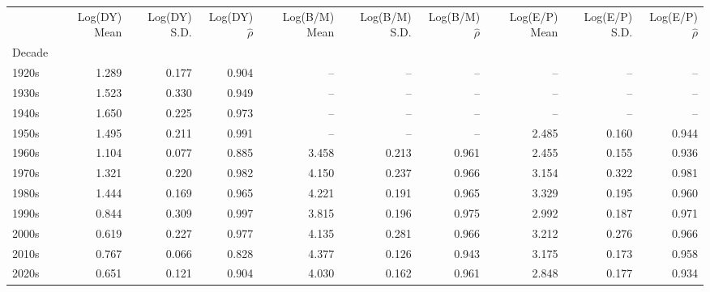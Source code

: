 \begin{tabular}{lrrrrrrrrr}
\toprule
 & Log(DY) Mean & Log(DY) S.D. & Log(DY) $\hat\rho$ & Log(B/M) Mean & Log(B/M) S.D. & Log(B/M) $\hat\rho$ & Log(E/P) Mean & Log(E/P) S.D. & Log(E/P) $\hat\rho$ \\
Decade &  &  &  &  &  &  &  &  &  \\
\midrule
1920s & 1.289 & 0.177 & 0.904 & -- & -- & -- & -- & -- & -- \\
1930s & 1.523 & 0.330 & 0.949 & -- & -- & -- & -- & -- & -- \\
1940s & 1.650 & 0.225 & 0.973 & -- & -- & -- & -- & -- & -- \\
1950s & 1.495 & 0.211 & 0.991 & -- & -- & -- & 2.485 & 0.160 & 0.944 \\
1960s & 1.104 & 0.077 & 0.885 & 3.458 & 0.213 & 0.961 & 2.455 & 0.155 & 0.936 \\
1970s & 1.321 & 0.220 & 0.982 & 4.150 & 0.237 & 0.966 & 3.154 & 0.322 & 0.981 \\
1980s & 1.444 & 0.169 & 0.965 & 4.221 & 0.191 & 0.965 & 3.329 & 0.195 & 0.960 \\
1990s & 0.844 & 0.309 & 0.997 & 3.815 & 0.196 & 0.975 & 2.992 & 0.187 & 0.971 \\
2000s & 0.619 & 0.227 & 0.977 & 4.135 & 0.281 & 0.966 & 3.212 & 0.276 & 0.966 \\
2010s & 0.767 & 0.066 & 0.828 & 4.377 & 0.126 & 0.943 & 3.175 & 0.173 & 0.958 \\
2020s & 0.651 & 0.121 & 0.904 & 4.030 & 0.162 & 0.961 & 2.848 & 0.177 & 0.934 \\
\bottomrule
\end{tabular}
